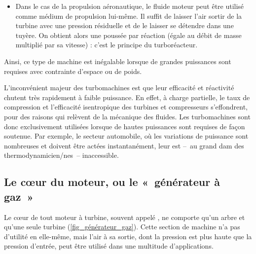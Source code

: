 		\begin{itemize}
			\item Dans le cas de la propulsion aéronautique, le fluide moteur peut être utilisé comme médium de propulsion lui-même. Il suffit de laisser l’air sortir de la turbine avec une pression résiduelle et de le laisser se détendre dans une tuyère. On obtient alors une poussée par réaction (égale au débit de masse multiplié par sa vitesse) : c’est le principe du turboréacteur.
		\end{itemize}

		Ainsi, ce type de machine est inégalable lorsque de grandes puissances sont requises avec contrainte d’espace ou de poids.

		L’inconvénient majeur des turbomachines est que leur efficacité et réactivité chutent très rapidement à faible puissance. En effet, à charge partielle, le taux de compression et l’efficacité isentropique des turbines et compresseurs s’effondrent, pour des raisons qui relèvent de la mécanique des fluides. Les turbomachines sont donc exclusivement utilisées lorsque de hautes puissances sont requises de façon soutenue. Par exemple, le secteur automobile, où les variations de puissance sont nombreuses et doivent être actées instantanément, leur est --\ au grand dam des thermodynamicien/nes\ -- inaccessible.


	\subsection{Le cœur du moteur, ou le «~générateur à gaz~»}
	\label{ch_generateur_gaz}

		Le cœur de tout moteur à turbine, souvent appelé , ne comporte qu’un arbre et qu’une seule turbine (\cref{fig_générateur_gaz}). Cette section de machine n’a pas d’utilité en elle-même, mais l’air à sa sortie, dont la pression est plus haute que la pression d’entrée, peut être utilisé dans une multitude d’applications.

